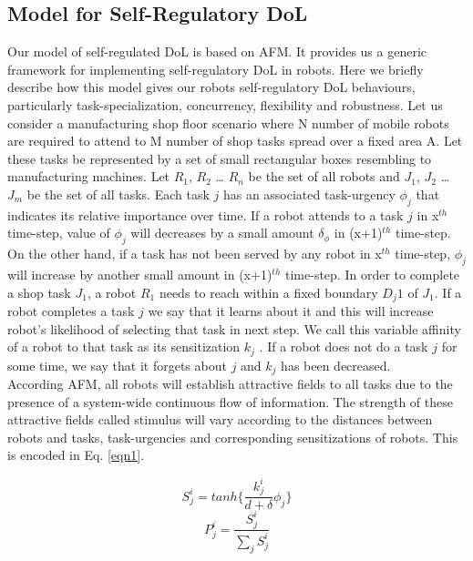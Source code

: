 \documentclass[a4paper, 10pt, conference]{ieeeconf}      %
\begin{document}
\subsection{Model for Self-Regulatory DoL}
Our model of self-regulated DoL is based on AFM. It provides us a generic framework for implementing self-regulatory DoL in robots. Here we briefly describe how this model gives our robots self-regulatory DoL behaviours, particularly task-specialization, concurrency, flexibility and robustness.
Let us consider a manufacturing shop floor scenario where N number of mobile robots are required to attend to M number of shop tasks spread over a fixed area A. Let these tasks be represented by a set of small rectangular boxes resembling to manufacturing machines. Let $R_1$, $R_2$ … $R_n$ be the set of all robots and $J_1$, $J_2$ … $J_m$ be the set of all tasks. Each task $j$ has an associated task-urgency $\phi_j$ that indicates its relative importance over time. If a robot attends to a task $j$ in x$^{th}$ time-step, value of $\phi_j$ will decreases by a small amount $\delta_\phi$ in (x+1)$^{th}$ time-step. On the other hand, if a task has not been served by any robot in x$^{th}$ time-step,  $\phi_j$  will increase by another small amount in (x+1)$^{th}$ time-step. In order to complete a shop task $J_1$, a robot $R_1$ needs to reach within a fixed boundary $D_j1$ of $J_1$. If a robot completes a task $j$ we say that it learns about it and this will increase robot's likelihood of selecting that task in next step. We call this variable affinity of a robot to that task as its sensitization $k_j$ . If a robot does not do a task $j$ for some time, we say that it forgets about $j$ and $k_j$ has been decreased.\\
According AFM, all robots will establish attractive fields to all tasks due to the presence of a system-wide continuous flow of information. The strength of these attractive fields called stimulus will vary according to the distances between robots and tasks, task-urgencies and corresponding  sensitizations of robots. This is encoded in Eq. \ref{eqn1}.
\begin{small}
\begin{multicols}{2} 
\begin{equation}
S_{j}^{i} = tanh\{\frac{k_{j}^{i}}{d+\delta } \phi _{j}\}
\label{eqn1}
\end{equation}
\vspace*{0.25cm}
\begin{equation}
P_{j}^{i} = \frac{S_{j}^{i}}{\sum_{j}^{}S_{j}^{i}}
\label{eqn2}
\end{equation}
\end{multicols}
\end{small}
\end{document}
